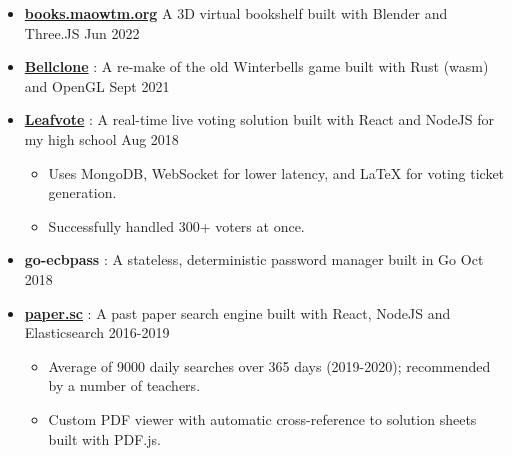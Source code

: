   \begin{itemize}

    \item \href{https://books.maowtm.org}{\textbf{\color{link}books.maowtm.org}}  \dashdiv{} A 3D virtual bookshelf built with Blender and Three.JS \dashdiv{} Jun 2022

    \item \href{https://bellclone.maowtm.org/}{\color{link}\textbf{Bellclone}} : A re-make of the old Winterbells game built with Rust (wasm) and OpenGL \dashdiv{} Sept 2021

    \item \href{https://leafvote.mww.moe}{\color{link}\textbf{Leafvote}} : A real-time live voting solution built with React and NodeJS for my high school \dashdiv{} Aug 2018

    \begin{itemize}
      \item Uses MongoDB, WebSocket for lower latency, and LaTeX for voting ticket generation.
      \item Successfully handled 300+ voters at once.
    \end{itemize}

    \item \textbf{go-ecbpass} : A stateless, deterministic password manager built in Go \dashdiv{} Oct 2018

    \item \href{https://paper.sc}{\color{link}\textbf{paper.sc}} : A past paper search engine built with React, NodeJS and Elasticsearch \dashdiv{} 2016-2019

    \begin{itemize}
      \item Average of \raisebox{0.2\baselineskip}{\texttildelow}9000 daily searches over 365 days (2019-2020); recommended by a number of teachers.
      \item Custom PDF viewer with automatic cross-reference to solution sheets built with PDF.js.
    \end{itemize}

  \end{itemize}


